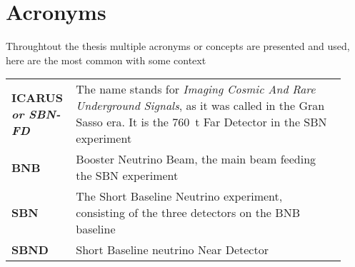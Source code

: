 \chapter{Acronyms}

Throughtout the thesis multiple acronyms or concepts are presented and used, here are the most common with some context

\begin{tabular}{@{}>{\bfseries}p{0.15\linewidth}p{0.78\linewidth}@{}}
    ICARUS \newline \emph{or SBN-FD} & The name stands for \emph{Imaging Cosmic And Rare Underground Signals}, as it was called in the Gran Sasso era. It is the \SI{760}{\tonne} Far Detector in the SBN experiment \\
    BNB & Booster Neutrino Beam, the main beam feeding the SBN experiment \\
    SBN & The Short Baseline Neutrino experiment, consisting of the three detectors on the BNB baseline \\
    SBND & Short Baseline neutrino Near Detector \\ 

\end{tabular}